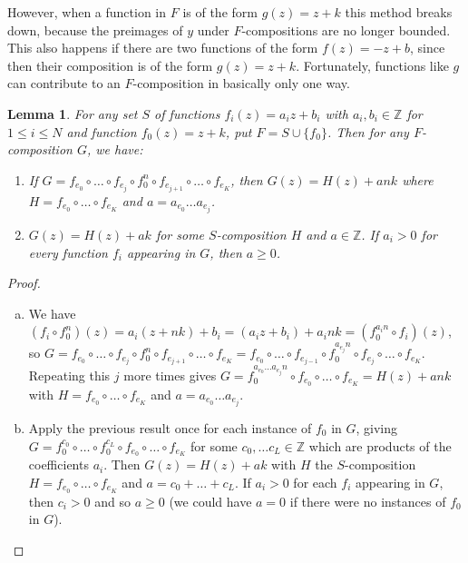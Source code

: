 \documentclass[11pt]{amsart}
\newcommand{\Z}{\mathbb{Z}}
\newcommand{\tab}{\;\;\;\;\;}
\newtheorem{lemma}{Lemma}
\theoremstyle{definition}
\theoremstyle{remark}
\begin{document}
However, when a function in $F$ is of the form $g(z) = z + k$ this method breaks down, because the preimages of $y$ under $F$-compositions are no longer bounded. This also happens if there are two functions of the form $f(z)=-z+b$, since then their composition is of the form $g(z)=z+k$. Fortunately, functions like $g$ can contribute to an $F$-composition in basically only one way.
\begin{lemma}
\label{extraction-lemma}
For any set $S$ of functions $f_i(z) = a_i z + b_i$ with $a_i, b_i \in \Z$ for $1 \le i \le N$ and function $f_0(z) = z + k$, put $F = S \cup \{f_0\}$. Then for any $F$-composition $G$, we have:
\begin{enumerate}[\tab (a)]
\item If $G = f_{e_0} \circ \dots \circ f_{e_j} \circ f_0^n \circ f_{e_{j+1}} \circ \dots \circ f_{e_K}$, then $G(z) = H(z) + ank$ where $H = f_{e_0} \circ \dots \circ f_{e_K}$ and $a = a_{e_0} \dots a_{e_j}$. \label{single-extraction}
\item $G(z) = H(z) + ak$ for some $S$-composition $H$ and $a \in \Z$. If $a_i > 0$ for every function $f_i$ appearing in $G$, then $a \ge 0$. \label{total-extraction}
\end{enumerate}
\end{lemma}
\begin{proof}
\begin{enumerate}[(a)]
\item We have $(f_i \circ f_0^n)(z) = a_i (z + nk) + b_i = (a_i z + b_i) + a_i n k = (f_0^{a_i n} \circ f_i)(z)$, so $G = f_{e_0} \circ \dots \circ f_{e_j} \circ f_0^n \circ f_{e_{j+1}} \circ \dots \circ f_{e_K} = f_{e_0} \circ \dots \circ f_{e_{j-1}} \circ f_0^{a_{e_j} n} \circ f_{e_j} \circ \dots \circ f_{e_K}$. Repeating this $j$ more times gives $G = f_0^{a_{e_0} \dots a_{e_j} n} \circ f_{e_0} \circ \dots \circ f_{e_K} = H(z) + ank$ with $H = f_{e_0} \circ \dots \circ f_{e_K}$ and $a = a_{e_0} \dots a_{e_j}$.
\item Apply the previous result once for each instance of $f_0$ in $G$, giving $G = f_0^{c_0} \circ \dots \circ f_0^{c_L} \circ f_{e_0} \circ \dots \circ f_{e_K}$ for some $c_0, \dots c_L \in \Z$ which are products of the coefficients $a_i$. Then $G(z) = H(z) + ak$ with $H$ the $S$-composition $H = f_{e_0} \circ \dots \circ f_{e_K}$ and $a = c_0 + \dots + c_L$. If $a_i > 0$ for each $f_i$ appearing in $G$, then $c_i > 0$ and so $a \ge 0$ (we could have $a = 0$ if there were no instances of $f_0$ in $G$). \qedhere
\end{enumerate}
\end{proof}
\end{document}
